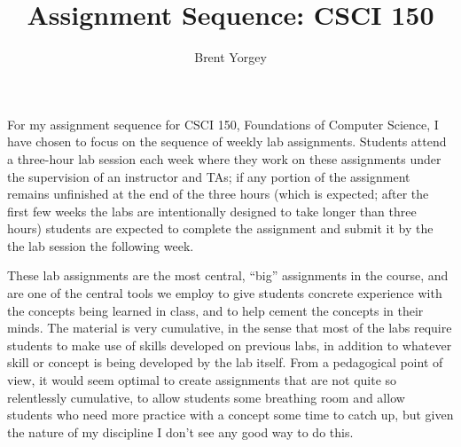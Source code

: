 \documentclass{article}
\begin{document}
\title{Assignment Sequence: CSCI 150}
\author{Brent Yorgey}

\maketitle

For my assignment sequence for CSCI 150, Foundations of Computer
Science, I have chosen to focus on the sequence of weekly lab
assignments.  Students attend a three-hour lab session each week where
they work on these assignments under the supervision of an instructor
and TAs; if any portion of the assignment remains unfinished at the
end of the three hours (which is expected; after the first few weeks
the labs are intentionally designed to take longer than three hours)
students are expected to complete the assignment and submit it by the
the lab session the following week.

These lab assignments are the most central, ``big'' assignments in the
course, and are one of the central tools we employ to give students
concrete experience with the concepts being learned in class, and to
help cement the concepts in their minds.  The material is very
cumulative, in the sense that most of the labs require students to
make use of skills developed on previous labs, in addition to whatever
skill or concept is being developed by the lab itself.  From a
pedagogical point of view, it would seem optimal to create assignments
that are not quite so relentlessly cumulative, to allow students some
breathing room and allow students who need more practice with a
concept some time to catch up, but given the nature of my discipline I
don't see any good way to do this.
\end{document}
